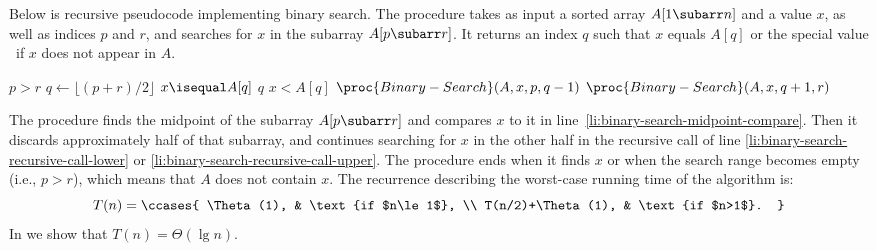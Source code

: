 
\noindent Below is recursive pseudocode implementing binary search.
The procedure takes as input a sorted array $A[1\subarr n]$ and a value $x$, as well as indices $p$ and $r$, and searches for $x$ in the subarray $A[p\subarr r]$.
It returns an index $q$ such that $x$ equals $A[q]$ or the special value \nil\ if $x$ does not appear in $A$.

\begin{codebox}
\li \If $p>r$
\li     \Then \Return \nil \label{li:binary-search-not-found}
        \End
\li $q\gets\lfloor(p+r)/2\rfloor$
\li \If $x\isequal A[q]$ \label{li:binary-search-midpoint-compare}
\li     \Then \Return $q$
        \End
\li \If $x<A[q]$
\li     \Then \Return $\proc{Binary-Search}(A,x,p,q-1)$ \label{li:binary-search-recursive-call-lower}
\li     \Else \Return $\proc{Binary-Search}(A,x,q+1,r)$ \label{li:binary-search-recursive-call-upper}
        \End
\end{codebox}

The procedure finds the midpoint of the subarray $A[p\subarr r]$ and compares $x$ to it in line~\ref{li:binary-search-midpoint-compare}.
Then it discards approximately half of that subarray, and continues searching for $x$ in the other half in the recursive call of line \ref{li:binary-search-recursive-call-lower} or \ref{li:binary-search-recursive-call-upper}.
The procedure ends when it finds $x$ or when the search range becomes empty (i.e., $p>r$), which means that $A$ does not contain $x$.
The recurrence describing the worst-case running time of the algorithm is:
\[
    T(n) =
    \ccases{
        \Theta(1), & \text{if $n\le1$}, \\
        T(n/2)+\Theta(1), & \text{if $n>1$}.
    }
\]
In  we show that $T(n)=\Theta(\lg n)$.
